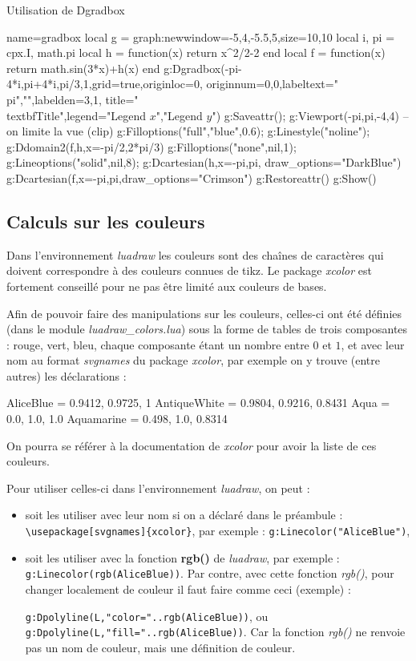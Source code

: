 \begin{demo}{Utilisation de Dgradbox}
\begin{luadraw}{name=gradbox}
local g = graph:new{window={-5,4,-5.5,5},size={10,10}}
local i, pi = cpx.I, math.pi
local h = function(x) return x^2/2-2 end
local f = function(x) return math.sin(3*x)+h(x) end
g:Dgradbox({-pi-4*i,pi+4*i,pi/3,1},{grid=true,originloc=0, originnum={0,0},labeltext={"\\pi",""},labelden={3,1}, title="\\textbf{Title}",legend={"Legend $x$","Legend $y$"}})
g:Saveattr(); g:Viewport(-pi,pi,-4,4) -- on limite la vue (clip)
g:Filloptions("full","blue",0.6); g:Linestyle("noline"); g:Ddomain2(f,h,{x={-pi/2,2*pi/3}})
g:Filloptions("none",nil,1); g:Lineoptions("solid",nil,8); g:Dcartesian(h,{x={-pi,pi}, draw_options="DarkBlue"})
g:Dcartesian(f,{x={-pi,pi},draw_options="Crimson"})
g:Restoreattr()
g:Show()
\end{luadraw}
\end{demo}

\subsection{Calculs sur les couleurs}

Dans l'environnement \emph{luadraw} les couleurs sont des chaînes de caractères qui doivent correspondre à des couleurs connues de tikz. Le package \emph{xcolor} est fortement conseillé pour ne pas être limité aux couleurs de bases.

Afin de pouvoir faire des manipulations sur les couleurs, celles-ci ont été définies (dans le module \emph{luadraw\_colors.lua}) sous la forme de tables de trois composantes : rouge, vert, bleu, chaque composante étant un nombre entre $0$ et $1$, et avec leur nom au format \emph{svgnames} du package \emph{xcolor}, par exemple on y trouve (entre autres) les déclarations :
\begin{Luacode}
AliceBlue = {0.9412, 0.9725, 1}
AntiqueWhite = {0.9804, 0.9216, 0.8431}
Aqua = {0.0, 1.0, 1.0}
Aquamarine = {0.498, 1.0, 0.8314}
\end{Luacode}
On pourra se référer à la documentation de \emph{xcolor} pour avoir la liste de ces couleurs.

Pour utiliser celles-ci dans l'environnement \emph{luadraw}, on peut :
\begin{itemize}
    \item soit les utiliser avec leur nom si on a déclaré dans le préambule : \verb|\usepackage[svgnames]{xcolor}|, par exemple : \texttt{g:Linecolor("AliceBlue")},
    \item soit les utiliser avec la fonction \textbf{rgb()} de \emph{luadraw}, par exemple : \texttt{g:Linecolor(rgb(AliceBlue))}. Par contre, avec cette fonction \emph{rgb()}, pour changer localement de couleur il faut faire comme ceci (exemple) : \par
    \texttt{g:Dpolyline(L,"color="..rgb(AliceBlue))}, ou \texttt{g:Dpolyline(L,"fill="..rgb(AliceBlue))}. Car la fonction \emph{rgb()} ne renvoie pas un nom de couleur, mais une définition de couleur.
\end{itemize}

